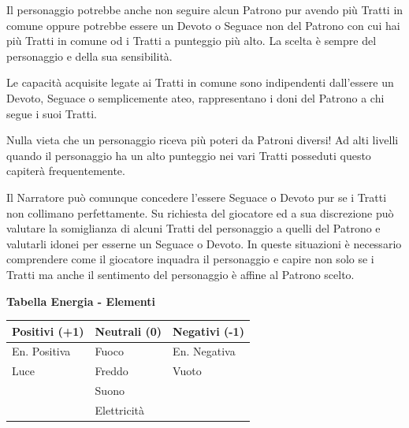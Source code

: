 \begin{multicols}{2}
Il personaggio potrebbe anche non seguire alcun Patrono pur avendo più Tratti in comune oppure potrebbe essere un Devoto o Seguace non del Patrono con cui hai più Tratti in comune od i Tratti a punteggio più alto. La scelta è sempre del personaggio e della sua sensibilità.

Le capacità acquisite legate ai Tratti in comune sono indipendenti dall'essere un Devoto, Seguace o semplicemente ateo, rappresentano i doni del Patrono a chi segue i suoi Tratti.

Nulla vieta che un personaggio riceva più poteri da Patroni diversi! Ad alti livelli quando il personaggio ha un alto punteggio nei vari Tratti posseduti questo capiterà frequentemente. 

\begin{narratore}[Adattarsi]
Il Narratore può comunque concedere l'essere Seguace o Devoto pur se i Tratti non collimano perfettamente. Su richiesta del giocatore ed a sua discrezione può valutare la somiglianza di alcuni Tratti del personaggio a quelli del Patrono e valutarli idonei per esserne un Seguace o Devoto. In queste situazioni è necessario comprendere come il giocatore inquadra il personaggio e capire non solo se i Tratti ma anche il sentimento del personaggio è affine al Patrono scelto.
\end{narratore}


\medskip

\textbf{Tabella Energia - Elementi}

\medskip

\noindent\begin{tabularx}{\linewidth}{lXX}
	\toprule
\rowcolor{gray!20}\textbf{Positivi} (+1) & \textbf{Neutrali} (0) & \textbf{Negativi} (-1)\\
\toprule
En. Positiva& Fuoco& En. Negativa\\
\rowcolor{gray!20}Luce & Freddo& Vuoto\\
& Suono & \\
\rowcolor{gray!20}& Elettricità &
\end{tabularx}


\end{multicols}
